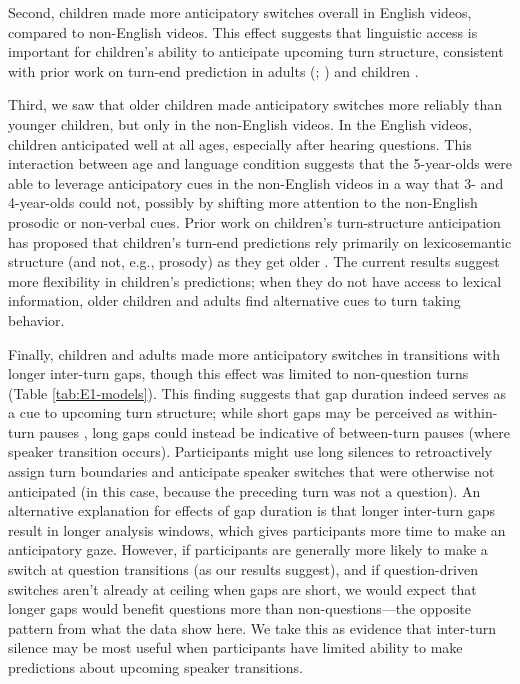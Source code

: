 \documentclass[authoryear, 12pt]{elsarticle}
\begin{document}
Second, children made more anticipatory switches overall in English videos, compared to non-English videos. This effect suggests that linguistic access is important for children's ability to anticipate upcoming turn structure, consistent with prior work on turn-end prediction in adults (\citealp{de-ruiter2006}; \citealp{magyari2012}) and children \citep{keitel2013}.

Third, we saw that older children made anticipatory switches more reliably than younger children, but only in the non-English videos. In the English videos, children anticipated well at all ages, especially after hearing questions. This interaction between age and language condition suggests that the 5-year-olds were able to leverage anticipatory cues in the non-English videos in a way that 3- and 4-year-olds could not, possibly by shifting more attention to the non-English prosodic or non-verbal cues. Prior work on children's turn-structure anticipation has proposed that children's turn-end predictions rely primarily on lexicosemantic structure (and not, e.g., prosody) as they get older \citep{keitel2013}. The current results suggest more flexibility in children's predictions; when they do not have access to lexical information, older children and adults find alternative cues to turn taking behavior.

Finally, children and adults made more anticipatory switches in transitions with longer inter-turn gaps, though this effect was limited to non-question turns (Table \ref{tab:E1-models}). This finding suggests that gap duration indeed serves as a cue to upcoming turn structure; while short gaps may be perceived as within-turn pauses \citep{mannel2009}, long gaps could instead be indicative of between-turn pauses (where speaker transition occurs). Participants might use long silences to retroactively assign turn boundaries and anticipate speaker switches that were otherwise not anticipated (in this case, because the preceding turn was not a question). An alternative explanation for effects of gap duration is that longer inter-turn gaps result in longer analysis windows, which gives participants more time to make an anticipatory gaze. However, if participants are generally more likely to make a switch at question transitions (as our results suggest), and if question-driven switches aren't already at ceiling when gaps are short, we would expect that longer gaps would benefit questions more than non-questions---the opposite pattern from what the data show here. We take this as evidence that inter-turn silence may be most useful when participants have limited ability to make predictions about upcoming speaker transitions.
\end{document}
